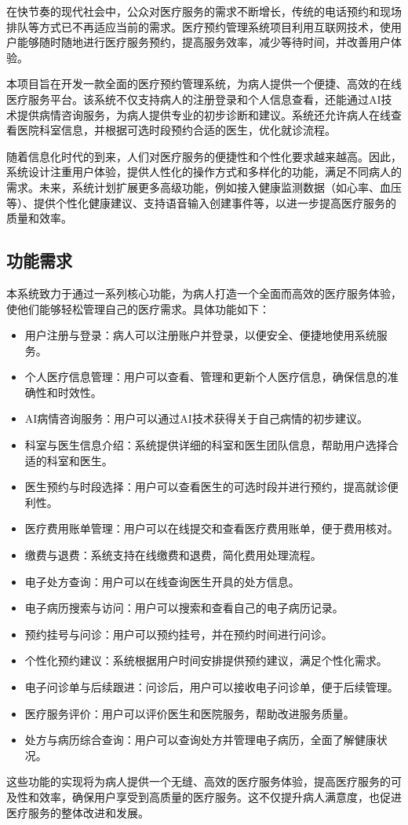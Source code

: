 在快节奏的现代社会中，公众对医疗服务的需求不断增长，传统的电话预约和现场排队等方式已不再适应当前的需求。医疗预约管理系统项目利用互联网技术，使用户能够随时随地进行医疗服务预约，提高服务效率，减少等待时间，并改善用户体验。

本项目旨在开发一款全面的医疗预约管理系统，为病人提供一个便捷、高效的在线医疗服务平台。该系统不仅支持病人的注册登录和个人信息查看，还能通过AI技术提供病情咨询服务，为病人提供专业的初步诊断和建议。系统还允许病人在线查看医院科室信息，并根据可选时段预约合适的医生，优化就诊流程。

随着信息化时代的到来，人们对医疗服务的便捷性和个性化要求越来越高。因此，系统设计注重用户体验，提供人性化的操作方式和多样化的功能，满足不同病人的需求。未来，系统计划扩展更多高级功能，例如接入健康监测数据（如心率、血压等）、提供个性化健康建议、支持语音输入创建事件等，以进一步提高医疗服务的质量和效率。

\subsection{功能需求}
本系统致力于通过一系列核心功能，为病人打造一个全面而高效的医疗服务体验，使他们能够轻松管理自己的医疗需求。具体功能如下：

\begin{itemize}
	\item 用户注册与登录：病人可以注册账户并登录，以便安全、便捷地使用系统服务。
	\item 个人医疗信息管理：用户可以查看、管理和更新个人医疗信息，确保信息的准确性和时效性。
	\item AI病情咨询服务：用户可以通过AI技术获得关于自己病情的初步建议。
	\item 科室与医生信息介绍：系统提供详细的科室和医生团队信息，帮助用户选择合适的科室和医生。
	\item 医生预约与时段选择：用户可以查看医生的可选时段并进行预约，提高就诊便利性。
	\item 医疗费用账单管理：用户可以在线提交和查看医疗费用账单，便于费用核对。
	\item 缴费与退费：系统支持在线缴费和退费，简化费用处理流程。
	\item 电子处方查询：用户可以在线查询医生开具的处方信息。
	\item 电子病历搜索与访问：用户可以搜索和查看自己的电子病历记录。
	\item 预约挂号与问诊：用户可以预约挂号，并在预约时间进行问诊。
	\item 个性化预约建议：系统根据用户时间安排提供预约建议，满足个性化需求。
	\item 电子问诊单与后续跟进：问诊后，用户可以接收电子问诊单，便于后续管理。
	\item 医疗服务评价：用户可以评价医生和医院服务，帮助改进服务质量。
	\item 处方与病历综合查询：用户可以查询处方并管理电子病历，全面了解健康状况。
\end{itemize}

这些功能的实现将为病人提供一个无缝、高效的医疗服务体验，提高医疗服务的可及性和效率，确保用户享受到高质量的医疗服务。这不仅提升病人满意度，也促进医疗服务的整体改进和发展。